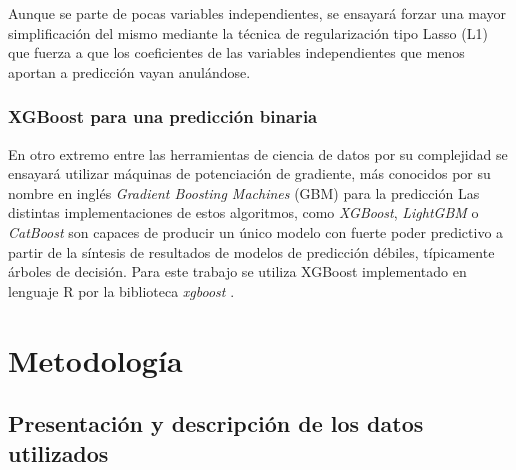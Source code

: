 \documentclass[a4paper]{report}
\begin{document}
Aunque se parte de pocas variables independientes, se ensayará forzar una mayor simplificación del mismo mediante la técnica de regularización tipo Lasso (L1) que fuerza a que los coeficientes de las variables independientes que menos aportan a predicción vayan anulándose.



\subsection{XGBoost para una predicción binaria}

En otro extremo entre las herramientas de ciencia de datos por su complejidad se ensayará utilizar máquinas de potenciación de gradiente, más conocidos por su nombre en inglés \emph{Gradient Boosting Machines} (GBM) para la predicción
Las distintas implementaciones de estos algoritmos, como \emph{XGBoost}, \emph{LightGBM} o \emph{CatBoost} son capaces de producir un único modelo con fuerte poder predictivo a partir de la síntesis de resultados de modelos de predicción débiles, típicamente árboles de decisión. 
Para este trabajo se utiliza XGBoost implementado en lenguaje R por la biblioteca \emph{xgboost} \cite{chen_xgboost_2024}.






\chapter{Metodología}

\section{Presentación y descripción de los datos utilizados}
\end{document}
